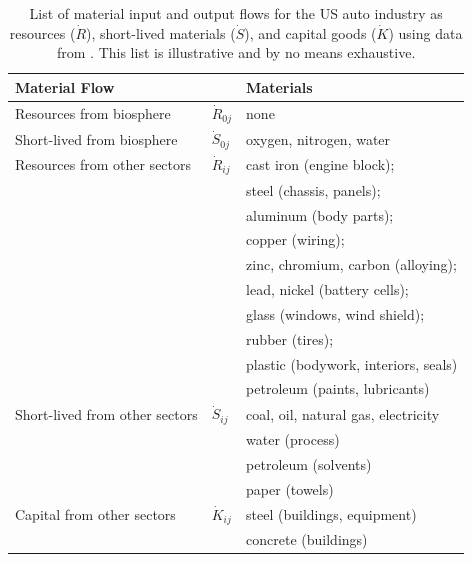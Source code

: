 \begin{table}
\caption[List of material input and output flows for the 
US auto industry]{List of material input and output flows for 
the US auto industry 
as resources ($\dot{R}$),
short-lived materials ($\dot{S}$),
and capital goods ($\dot{K}$)
using data from \cite{Sullivan1998, MacLean1998,Schweimer2000,
McCleese2002,MacLean2003, Burnham2006,Sullivan2010, Hawkins2012}.
This list is illustrative and by no means exhaustive.}
\begin{center}
 \begin{tabular}{p{4cm}p{1cm}p{5.2cm}}
\toprule 
\textbf{Material Flow}		 		& 								& \textbf{Materials} 									\\
\midrule
Resources from biosphere		& $\dot{R}_{0j}$		& none															\\[0.15cm]
Short-lived from biosphere		&	$\dot{S}_{0j}$	& oxygen, nitrogen, water							\\
\midrule
Resources from other sectors	& $\dot{R}_{ij}$		&	 cast iron (engine block);							\\
												&								&	 steel (chassis, panels);							\\
												&								&	 aluminum (body parts); 							\\		
												&								&	 copper (wiring);										\\	
												&								&	 zinc, chromium, carbon (alloying); 			\\
												&								&	 lead, nickel (battery cells);		 				\\
												&								&	 glass (windows, wind shield);					\\
												&								&	 rubber (tires);											\\
												&								&	 plastic (bodywork, interiors, seals)			\\
												&								&	 petroleum (paints, lubricants)					\\[0.15cm]
Short-lived from other sectors	& $\dot{S}_{ij}$		&	 coal, oil, natural gas, electricity				\\
												&								&	 water (process)										\\
												&								&	 petroleum (solvents)								\\
												&								&	 paper (towels)										\\[0.15cm]
Capital from other sectors		& $\dot{K}_{ij}$		&	 steel (buildings, equipment)					\\
												&								&	 concrete (buildings)								\\

\end{tabular}
\end{center}
\end{table}
